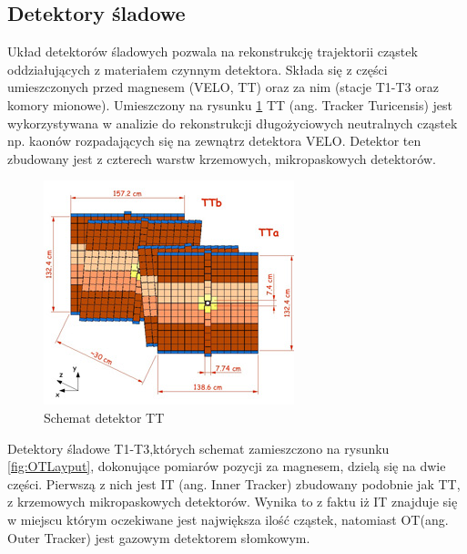 \subsection{Detektory śladowe}
Układ detektorów śladowych pozwala na rekonstrukcję trajektorii cząstek oddziałujących z materiałem czynnym detektora. Składa się z części umieszczonych przed magnesem (VELO, TT) oraz za nim (stacje T1-T3 oraz komory mionowe). Umieszczony na rysunku \ref{fig:TTlayout} TT (ang. Tracker Turicensis) jest wykorzystywana w analizie do rekonstrukcji długożyciowych neutralnych cząstek np. kaonów rozpadających się na zewnątrz detektora VELO. Detektor ten zbudowany jest z czterech warstw krzemowych, mikropaskowych detektorów. 
\begin{figure}[th]
  \centering
  \includegraphics[scale=1]{rozdzial2/TT-layout.jpg}
  \caption{Schemat detektor TT \cite{public}}
  \label{fig:TTlayout}
\end{figure}
Detektory śladowe T1-T3,których schemat zamieszczono na rysunku \ref{fig:OTLayput},  dokonujące pomiarów pozycji za magnesem, dzielą się na dwie części. Pierwszą z nich jest IT (ang. Inner Tracker) zbudowany podobnie jak TT, z krzemowych mikropaskowych detektorów. Wynika to z faktu iż IT znajduje się w miejscu którym oczekiwane jest największa ilość cząstek, natomiast OT(ang. Outer Tracker) jest gazowym detektorem słomkowym.

